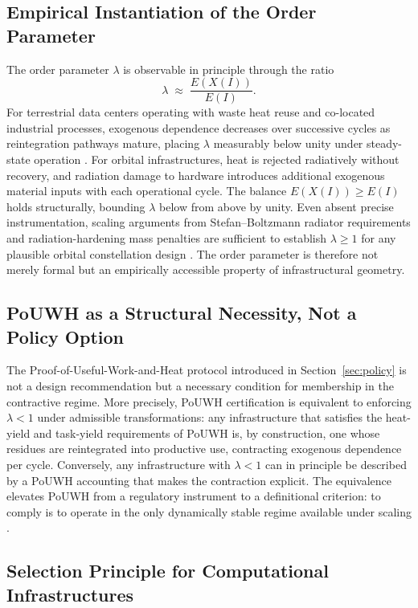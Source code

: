 \documentclass[11pt,a4paper]{article}
\theoremstyle{plain}
\theoremstyle{definition}
\theoremstyle{remark}
\begin{document}
\subsection{Empirical Instantiation of the Order Parameter}

The order parameter $\lambda$ is observable in principle through the ratio
\[
  \lambda \;\approx\; \frac{E(X(I))}{E(I)}.
\]
For terrestrial data centers operating with waste heat reuse and co-located
industrial processes, exogenous dependence decreases over successive cycles as
reintegration pathways mature, placing $\lambda$ measurably below unity under
steady-state operation \citep{masanet2020,rambo2014}. For orbital
infrastructures, heat is rejected radiatively without recovery, and radiation
damage to hardware introduces additional exogenous material inputs with each
operational cycle. The balance $E(X(I)) \geq E(I)$ holds structurally, bounding
$\lambda$ below from above by unity. Even absent precise instrumentation, scaling
arguments from Stefan--Boltzmann radiator requirements and radiation-hardening
mass penalties are sufficient to establish $\lambda \geq 1$ for any plausible
orbital constellation design \citep{nasa2016,wertz2011}. The order parameter is
therefore not merely formal but an empirically accessible property of
infrastructural geometry.

\subsection{PoUWH as a Structural Necessity, Not a Policy Option}

The Proof-of-Useful-Work-and-Heat protocol introduced in
Section~\ref{sec:policy} is not a design recommendation but a necessary
condition for membership in the contractive regime. More precisely, PoUWH
certification is equivalent to enforcing $\lambda < 1$ under admissible
transformations: any infrastructure that satisfies the heat-yield and task-yield
requirements of PoUWH is, by construction, one whose residues are reintegrated
into productive use, contracting exogenous dependence per cycle. Conversely, any
infrastructure with $\lambda < 1$ can in principle be described by a PoUWH
accounting that makes the contraction explicit. The equivalence elevates PoUWH
from a regulatory instrument to a definitional criterion: to comply is to operate
in the only dynamically stable regime available under scaling
\citep{eu2023,bennett1982,landauer1961}.

\subsection{Selection Principle for Computational Infrastructures}
\end{document}
